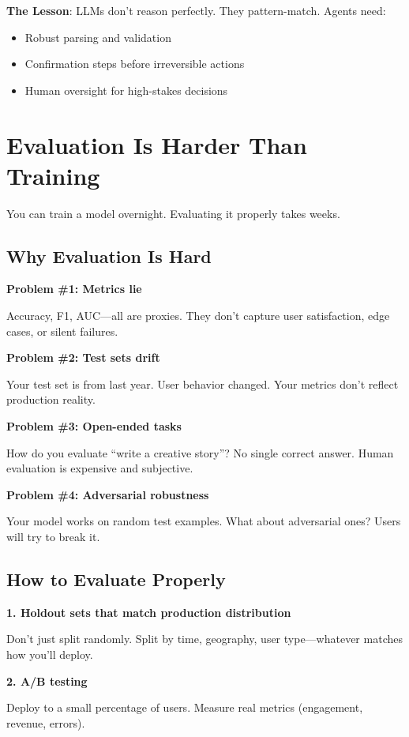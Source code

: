 \documentclass[11pt,oneside]{book}
\begin{document}
\textbf{The Lesson}: LLMs don't reason perfectly. They pattern-match. Agents need:
\begin{itemize}
\item Robust parsing and validation
\item Confirmation steps before irreversible actions
\item Human oversight for high-stakes decisions
\end{itemize}

\section{Evaluation Is Harder Than Training}

You can train a model overnight. Evaluating it properly takes weeks.

\subsection{Why Evaluation Is Hard}

\textbf{Problem \#1: Metrics lie}

Accuracy, F1, AUC---all are proxies. They don't capture user satisfaction, edge cases, or silent failures.

\textbf{Problem \#2: Test sets drift}

Your test set is from last year. User behavior changed. Your metrics don't reflect production reality.

\textbf{Problem \#3: Open-ended tasks}

How do you evaluate ``write a creative story''? No single correct answer. Human evaluation is expensive and subjective.

\textbf{Problem \#4: Adversarial robustness}

Your model works on random test examples. What about adversarial ones? Users will try to break it.

\subsection{How to Evaluate Properly}

\textbf{1. Holdout sets that match production distribution}

Don't just split randomly. Split by time, geography, user type---whatever matches how you'll deploy.

\textbf{2. A/B testing}

Deploy to a small percentage of users. Measure real metrics (engagement, revenue, errors).
\end{document}
